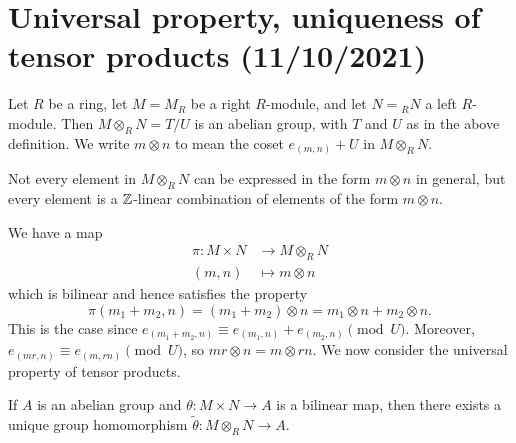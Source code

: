 \section{Universal property, uniqueness of tensor products (11/10/2021)}
Let $R$ be a ring, let $M = M_R$ be a right $R$-module, and let $N = {}_R N$
a left $R$-module. Then $M \otimes_R N = T/U$ is an abelian group, with 
$T$ and $U$ as in the above definition. 
We write $m \otimes n$ to mean the coset $e_{(m, n)} + U$ in $M \otimes_R N$. 

\begin{remark}{}
    Not every element in $M \otimes_R N$ can be expressed in the form  
    $m \otimes n$ in general, but every element is a $\mathbb{Z}$-linear combination of 
    elements of the form $m \otimes n$. 
\end{remark}

We have a map 
\begin{align*}
    \pi : M \times N &\to M \otimes_R N \\ 
    (m, n) &\mapsto m \otimes n
\end{align*}  
which is bilinear and hence satisfies the property 
\[ \pi(m_1 + m_2, n) = (m_1 + m_2) \otimes n = 
m_1 \otimes n + m_2 \otimes n. \] 
This is the case since $e_{(m_1+m_2, n)} \equiv e_{(m_1, n)} 
+ e_{(m_2, n)} \pmod{U}$. Moreover, $e_{(mr, n)} \equiv 
e_{(m, rn)} \pmod{U}$, so $mr \otimes n = m \otimes rn$. 
We now consider the universal property of tensor products. 

\begin{prop}{}
    If $A$ is an abelian group and $\theta : M \times N \to A$ is a bilinear map, 
    then there exists a unique group homomorphism $\tilde\theta : M \otimes_R N 
    \to A$.
    \begin{center}
    \end{center}
\end{prop}  

